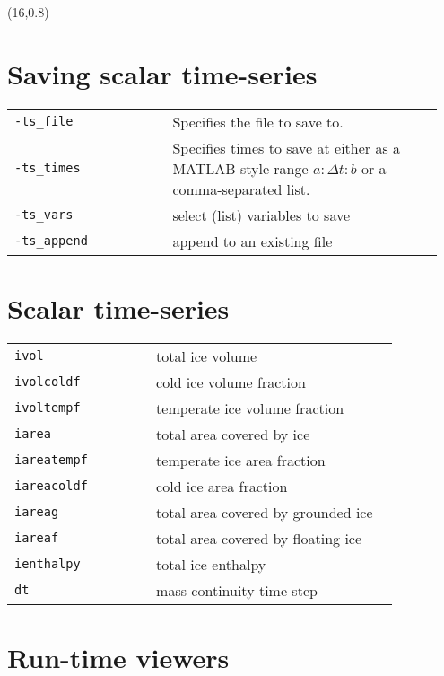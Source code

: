 \documentclass[landscape]{article}
\begin{document}
\begin{textblock}{15}(16,0.8)

\section{Saving scalar time-series}
\begin{tabular}{@{}p{0.35\linewidth}p{0.6\linewidth}@{}}
  \texttt{-ts_file} & Specifies the file to save to.\\
  \texttt{-ts_times} & Specifies times to save at either as a MATLAB-style range $a:\Delta t:b$ or a comma-separated list. \\
  \texttt{-ts_vars} & select (list) variables to save\\
  \texttt{-ts_append} & append to an existing file\\
\end{tabular}

\section{Scalar time-series}
\label{sec:scalar-time-series}

\begin{tabular}{@{}p{0.35\linewidth}p{0.6\linewidth}@{}}
\texttt{ivol} & total ice volume\\
\texttt{ivolcoldf} & cold ice volume fraction\\
\texttt{ivoltempf} & temperate ice volume fraction\\
\texttt{iarea} & total area covered by ice\\
\texttt{iareatempf} & temperate ice area fraction\\
\texttt{iareacoldf} & cold ice area fraction\\
\texttt{iareag} & total area covered by grounded ice\\
\texttt{iareaf} & total area covered by floating ice\\
\texttt{ienthalpy} & total ice enthalpy\\
\texttt{dt} & mass-continuity time step\\
\end{tabular}

\section{Run-time viewers}
\label{sec:run-time-viewers}


\end{textblock}
\end{document}
